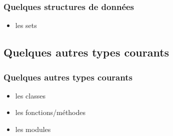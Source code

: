 \begin{frame}[fragile]
  \frametitle{Quelques structures de données}
  \begin{itemize}
    \item les sets
  \end{itemize}
  \begin{ipython}
    \ipoutp{set(['blue', 'green', 'yellow']])}
  \end{ipython}
\end{frame}


\subsection{Quelques autres types courants}
\begin{frame}
  \frametitle{Quelques autres types courants}
  \begin{itemize}
    \item les classes
    \item les fonctions/méthodes
    \item les modules
  \end{itemize}
\end{frame}

